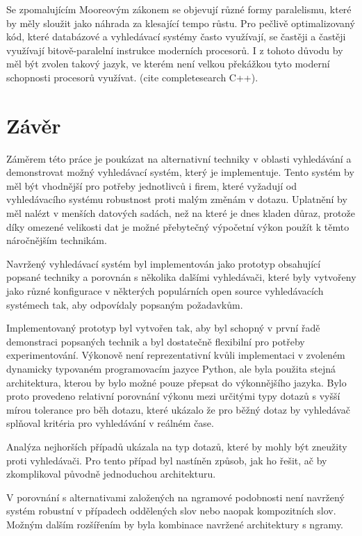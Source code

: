 \documentclass[11pt,letterpaper,oneside,openright]{book}
\begin{document}
Se zpomalujícím Mooreovým zákonem se objevují různé formy paralelismu, které by
měly sloužit jako náhrada za klesající tempo růstu. Pro pečlivě optimalizovaný
kód, které databázové a vyhledávací systémy často využívají, se častěji a
častěji využívají bitově-paralelní instrukce moderních procesorů. I z tohoto
důvodu by měl být zvolen takový jazyk, ve kterém není velkou překážkou tyto
moderní schopnosti procesorů využívat. (cite completesearch C++).


\chapter{Závěr}
Záměrem této práce je poukázat na alternativní techniky v oblasti vyhledávání a
demonstrovat možný vyhledávací systém, který je implementuje. Tento systém by
měl být vhodnější pro potřeby jednotlivců i firem, které vyžadují od
vyhledávacího systému robustnost proti malým změnám v dotazu. Uplatnění by měl
nalézt v menších datových sadách, než na které je dnes kladen důraz, protože
díky omezené velikosti dat je možné přebytečný výpočetní výkon použít k těmto
náročnějším technikám.

Navržený vyhledávací systém byl implementován jako prototyp obsahující popsané
techniky a porovnán s několika dalšími vyhledávači, které byly vytvořeny jako
různé konfigurace v některých populárních open source vyhledávacích systémech
tak, aby odpovídaly popsaným požadavkům.

Implementovaný prototyp byl vytvořen tak, aby byl schopný v první řadě
demonstraci popsaných technik a byl dostatečně flexibilní pro potřeby
experimentování. Výkonově není reprezentativní kvůli implementaci v zvoleném
dynamicky typovaném programovacím jazyce Python, ale byla použita stejná
architektura, kterou by bylo možné pouze přepsat do výkonnějšího jazyka. Bylo
proto provedeno relativní porovnání výkonu mezi určitými typy dotazů s vyšší
mírou tolerance pro běh dotazu, které ukázalo že pro běžný dotaz by vyhledávač
splňoval kritéria pro vyhledávání v reálném čase. 

Analýza nejhorších případů ukázala na typ dotazů, které by mohly být zneužity
proti vyhledávači. Pro tento případ byl nastíněn způsob, jak ho řešit, ač by
zkomplikoval původně jednoduchou architekturu.

V porovnání s alternativami založených na ngramové podobnosti není navržený
systém robustní v případech oddělených slov nebo naopak kompozitních slov.
Možným dalším rozšířením by byla kombinace navržené architektury s ngramy.
\end{document}
